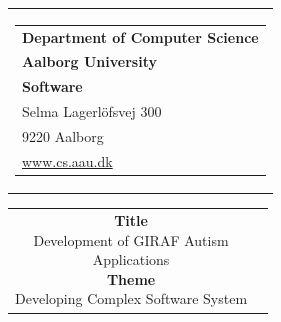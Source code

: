 


\thispagestyle{empty}

\begin{nopagebreak}
{
\samepage 
\begin{tabular}{r}
\parbox{\textwidth}
{
    \hfill \parbox{7.9cm}
    {
        \begin{tabular}{l}
            {\sf\small \textbf{Department of Computer Science}}\\
            {\sf\small \textbf{Aalborg University}}\\
            {\sf\small \textbf{Software}} \\
            {\sf\small Selma Lagerl\"{o}fsvej 300} \\
            {\sf\small 9220{  }Aalborg} \\
            {\sf\small \url{www.cs.aau.dk}}
        \end{tabular}
    }
}
\\
\end{tabular}

\begin{tabular}{cc}

    \parbox{6.5cm}
    {
        \textbf{Title} \\
        Development of GIRAF Autism\\Applications \\

        \textbf{Theme} \\ 
        Developing Complex Software System \\

}
\end{tabular}}
\end{nopagebreak}
